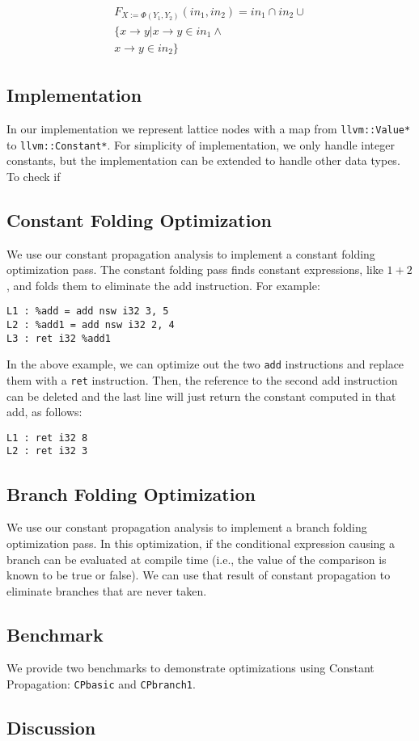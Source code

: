 \begin{align} 
	\begin{split}
		F_{X := \Phi(Y_1, Y_2)}(in_1, in_2) = in_1 \cap in_2  \cup \\
		\{x \to y | x \to y \in in_1 \wedge \\
		 x \to y \in in_2\}
	\end{split}
\end{align}

\subsection{Implementation}

In our implementation we represent lattice nodes with a map from \texttt{llvm::Value*} to \texttt{llvm::Constant*}. For simplicity of implementation, we only handle integer constants, but the implementation can be extended to handle other data types. \\

To check if 

\subsection{Constant Folding Optimization}

We use our constant propagation analysis to implement a constant folding optimization pass. The constant folding pass finds constant expressions, like $1+2$, and folds them to eliminate the add instruction. For example:

\begin{verbatim}
L1 : %add = add nsw i32 3, 5
L2 : %add1 = add nsw i32 2, 4
L3 : ret i32 %add1
\end{verbatim}

In the above example, we can optimize out the two \texttt{add} instructions and replace them with a \texttt{ret} instruction. Then, the reference to the second add instruction can be deleted and the last line will just return the constant computed in that add, as follows:

\begin{verbatim}
L1 : ret i32 8
L2 : ret i32 3
\end{verbatim}

\subsection{Branch Folding Optimization}

We use our constant propagation analysis to implement a branch folding optimization pass. In this optimization, if the conditional expression causing a branch can be evaluated at compile time (i.e., the value of the comparison is known to be true or false). We can use that result of constant propagation to eliminate branches that are never taken. 

\subsection{Benchmark}

We provide two benchmarks to demonstrate optimizations using Constant Propagation: \texttt{CPbasic} and \texttt{CPbranch1}.

\subsection{Discussion}
